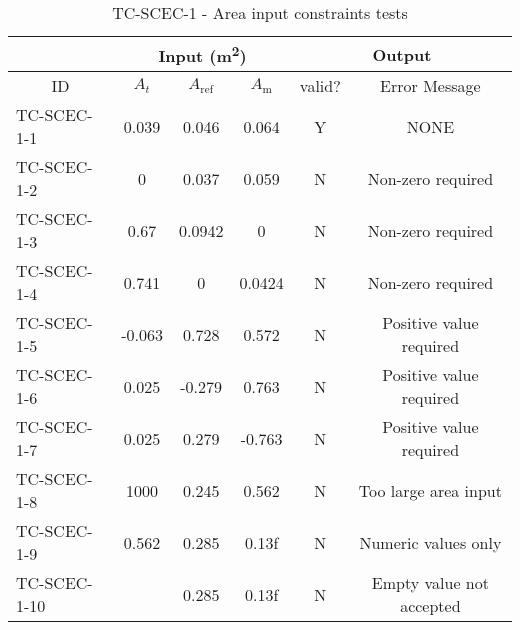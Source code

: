 \documentclass[12pt, titlepage]{article}
\begin{document}
\begin{center}
\begin{table}[h]
\resizebox{\textwidth}{!}
{ %
    \begin{tabular}{ lccccc }
    \hline
    \multicolumn{1}{l|}{}   & \multicolumn{3}{c|}{Input (\si[per-mode=symbol] {\square\metre}) }                            & \multicolumn{2}{c}{Output} \\ 
    
    \hline
    
    \multicolumn{1}{c|}{ID} &   ${A_t}$   &   $A_\text{ref}$   &   \multicolumn{1}{c|}{${A_{\text{m}}}$}   &   valid?   &   Error Message \\ \hline
    
    TC-SCEC-1-1   &   0.039  & 0.046  & 0.064    &  Y  & NONE                         \\
    TC-SCEC-1-2   &   0      & 0.037  & 0.059    &  N  & Non-zero required            \\
    TC-SCEC-1-3   &   0.67   & 0.0942 & 0        &  N  & Non-zero required            \\ 
    TC-SCEC-1-4   &   0.741  & 0      & 0.0424   &  N  & Non-zero required            \\
    TC-SCEC-1-5   &   -0.063 & 0.728  & 0.572    &  N  & Positive value required      \\
    TC-SCEC-1-6   &   0.025  & -0.279 & 0.763    &  N  & Positive value required      \\
    TC-SCEC-1-7   &   0.025  & 0.279  & -0.763   &  N  & Positive value required      \\
    TC-SCEC-1-8   &   1000   & 0.245  & 0.562    &  N  & Too large area input          \\
    TC-SCEC-1-9   &   0.562  & 0.285  & 0.13f    &  N  & Numeric values only         \\ 
    TC-SCEC-1-10   &    & 0.285  & 0.13f    &  N  & Empty value not accepted         \\ 
    
    \hline
    
    
    \end{tabular} %
}
\caption{TC-SCEC-1 - Area input constraints tests}
\label{tab:tc-SCEC-1}
\end{table}
\end{center}
\end{document}
